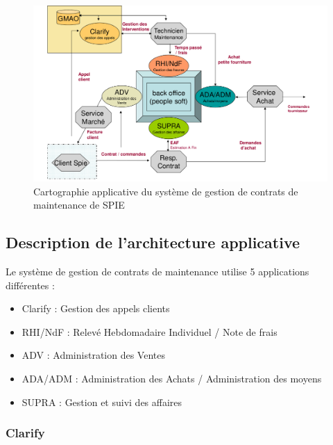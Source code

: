 \begin{figure}[h!]
    \centering
    \includegraphics[width=140mm]{./images/cartographie_applicative.png}
    \caption{Cartographie applicative du système de gestion de contrats de maintenance de SPIE}
    \label{diagram:carto_app}
\end{figure}

\subsection{Description de l'architecture applicative}

Le système de gestion de contrats de maintenance utilise 5 applications différentes :


\begin{itemize}
\item Clarify : Gestion des appels clients
\item RHI/NdF : Relevé Hebdomadaire Individuel / Note de frais
\item ADV : Administration des Ventes
\item ADA/ADM : Administration des Achats / Administration des moyens
\item SUPRA : Gestion et suivi des affaires
\end{itemize}


\subsubsection{Clarify}

